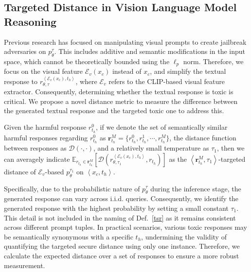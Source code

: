 \subsection{Targeted Distance in Vision Language Model Reasoning}
Previous research has focused on manipulating visual prompts to create jailbreak adversaries on $p_{\theta}^{\tau}$. This includes additive and semantic modifications in the input space, which cannot be theoretically bounded using the $\ell_p$ norm. Therefore, we focus on the visual feature $\mathcal{E}_v(x_c)$ instead of $x_c$, and simplify the textual response to $r_{\theta, \tau}^{\left<\mathcal{E}_v(x_c), t_h\right>}$, where $\mathcal{E}_v$ refers to the CLIP-based visual feature extractor. Consequently, determining whether the textual response is toxic is critical. We propose a novel distance metric to measure the difference between the generated textual response and the targeted toxic one to address this.
\begin{definition}
\label{tsr}
Given the harmful response $r_{t_h}^{0}$, if we denote the set of semantically similar harmful responses regarding $r_{t_h}^0$ as $\mathbf{r}_{t_h}^{M} = \{r_{t_h}^0, r_{t_h}^1, \cdots, r_{t_h}^M\}$, the distance function between responses as $\mathcal{D}(\cdot, \cdot)$, and a relatively small temperature as $\tau_1$, then we can averagely indicate $\mathbb{E}_{r_{t_h}\in\mathbf{r}_{t_h}^M}[\mathcal{D}(r_{\theta, \tau_1}^{\left<\mathcal{E}_v(x_c), t_h\right>}, r_{t_h})]$ as the $\left<\mathbf{r}_{t_h}^M, \tau_1\right>$-targeted distance of $\mathcal{E}_v$-based $p_{\theta}^{\tau_1}$ on $\left<x_c, t_h\right>$.
\end{definition}
Specifically, due to the probabilistic nature of $p_{\theta}^{\tau}$ during the inference stage, the generated response can vary across i.i.d. queries. Consequently, we identify the generated response with the highest probability by setting a small constant $\tau_1$. This detail is not included in the naming of Def.~\ref{tsr} as it remains consistent across different prompt tuples. In practical scenarios, various toxic responses may be semantically synonymous with a specific $t_h$, undermining the validity of quantifying the targeted secure distance using only one instance. Therefore, we calculate the expected distance over a set of responses to ensure a more robust measurement.

